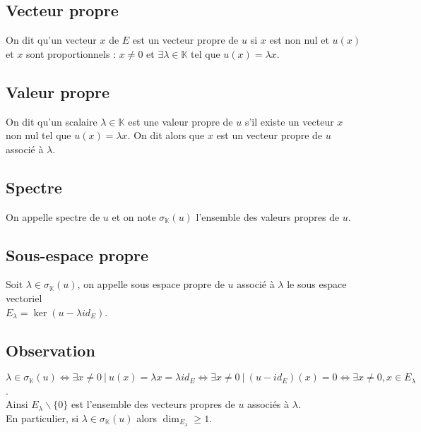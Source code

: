\documentclass[a4paper,10pt]{book} %
\newcommand{\K}{\mathbb{K}}
\newcommand{\tq}{~|~}
\begin{document}
\subsection{Vecteur propre}
On dit qu'un vecteur $x$ de $E$ est un vecteur propre de $u$ si $x$ est non nul et $u(x)$ et $x$ sont proportionnels : $x\neq 0$ et $\exists\lambda\in \K$ tel que $u(x)=\lambda x$.

\subsection{Valeur propre}
On dit qu'un scalaire $\lambda\in \K$ est une valeur propre de $u$ s'il existe un vecteur $x$ non nul tel que $u(x)=\lambda x$. On dit alors que $x$ est un vecteur propre de $u$ associé à $\lambda$.

\subsection{Spectre}
On appelle spectre de $u$ et on note $\sigma_{\K}(u)$ l'ensemble des valeurs propres de $u$.

\subsection{Sous-espace propre}
Soit $\lambda\in \sigma_{\K}(u)$, on appelle sous espace propre de $u$ associé à $\lambda$ le sous espace vectoriel\\$E_\lambda=\ker(u-\lambda id_E)$.

\subsection{Observation}
$\lambda\in \sigma_{\K}(u)\Leftrightarrow \exists x\neq 0 \tq u(x)=\lambda x=\lambda id_E \Leftrightarrow \exists x\neq 0 \tq (u- id_E)(x)=0 \Leftrightarrow \exists x\neq 0, x\in E_\lambda$.\\

Ainsi $E_\lambda\backslash\{0\}$ est l'ensemble des vecteurs propres de $u$ associés à $\lambda$.\\

En particulier, si $\lambda\in \sigma_{\K}(u)$ alors $\dim_{E_{\lambda}}\geq 1$.
\end{document}
